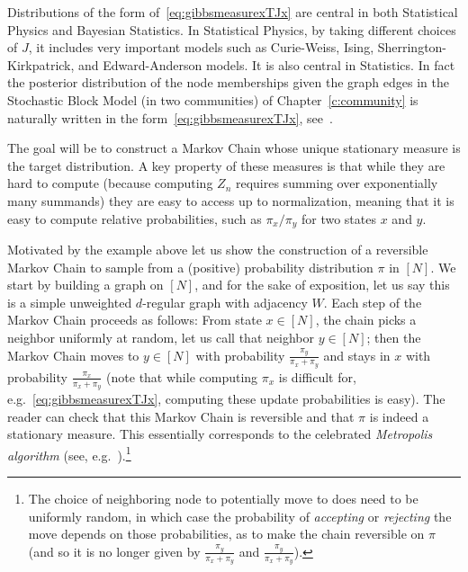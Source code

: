 Distributions of the form of~\eqref{eq:gibbsmeasurexTJx} are central in both Statistical Physics and Bayesian Statistics. In Statistical Physics, by taking different choices of $J$, it includes very important models such as Curie-Weiss, Ising, Sherrington-Kirkpatrick, and Edward-Anderson models. It is also central in Statistics. In fact the posterior distribution of the node memberships given the graph edges in the Stochastic Block Model (in two communities) of Chapter~\ref{c:community} is naturally written in the form~\eqref{eq:gibbsmeasurexTJx}, see~\cite{Abbe_SBM_survey}.

The goal will be to construct a Markov Chain whose unique stationary measure is the target distribution. A key property of these measures is that while they are hard to compute (because computing $Z_n$ requires summing over exponentially many summands) they are easy to access up to normalization, meaning that it is easy to compute relative probabilities, such as $\pi_x/\pi_y$ for two states $x$ and $y$.

Motivated by the example above let us show the construction of a reversible Markov Chain to sample from a (positive) probability distribution $\pi$ in $[N]$. We start by building a graph on $[N]$, and for the sake of exposition, let us say this is a simple unweighted $d$-regular graph with adjacency $W$. Each step of the Markov Chain proceeds as follows: From state $x\in[N]$, the chain picks a neighbor uniformly at random, let us call that neighbor $y\in[N]$; then the Markov Chain moves to $y\in[N]$ with probability $\frac{\pi_y}{\pi_x+\pi_y}$ and stays in $x$ with probability $\frac{\pi_x}{\pi_x+\pi_y}$ (note that while computing $\pi_x$ is difficult for, e.g.~\eqref{eq:gibbsmeasurexTJx}, computing these update probabilities is easy).  The reader can check that this Markov Chain is reversible and that $\pi$ is indeed a stationary measure. This essentially corresponds to the celebrated {\em Metropolis algorithm} (see, e.g.~\cite{Newman-Barkema-MCMC99}).\footnote{The choice of neighboring node to potentially move to does need to be uniformly random, in which case the probability of \emph{accepting} or \emph{rejecting} the move depends on those probabilities, as to make the chain reversible on $\pi$ (and so it is no longer given by $\frac{\pi_y}{\pi_x+\pi_y}$ and $\frac{\pi_y}{\pi_x+\pi_y}$).}

